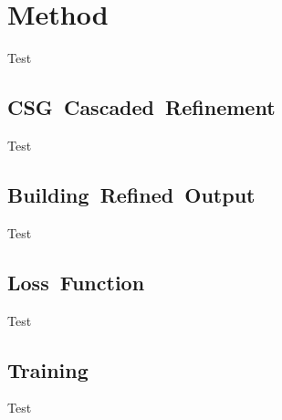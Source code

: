 
\chapter{Method}
\label{chap:method}

Test


\section{CSG~Cascaded~Refinement}
\label{subsec:csg_cascaded_refinement}

Test


\section{Building~Refined~Output}
\label{subsec:encoder_network}

Test


\section{Loss~Function}
\label{subsec:loss_function}

Test


\section{Training}
\label{subsec:training}

Test